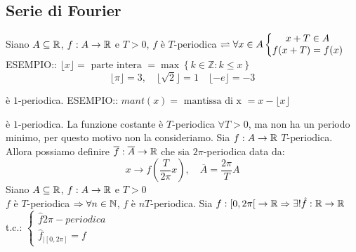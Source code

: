 \subsection{Serie di Fourier}
Siano $A\subseteq \mathbb{R}$, $f:A\to \mathbb{R}$ e $T>0$, $f$ è $T$-periodica $\rightleftharpoons \forall x\in A
\left\{\begin{matrix}
x+T\in A\\f(x+T)=f(x)
\end{matrix}\right. $\\


ESEMPIO:: $\lfloor x \rfloor = \text{ parte intera } = \max\left\{k\in\mathbb{Z}:k\le x\right\}$
\[\lfloor \pi \rfloor=3, \quad \lfloor \sqrt{2} \rfloor = 1 \quad \lfloor -e \rfloor = -3 \]
\begin{center}
\end{center}
è $1$-periodica.
ESEMPIO:: $mant(x)=\text{ mantissa di x } = x- \lfloor x \rfloor$
\begin{center}
\end{center}
è $1$-periodica.
\observation
La funzione costante è $T$-periodica $\forall T>0$, ma non ha un periodo minimo, per questo motivo non la consideriamo.
\observation
Sia $f:A\to \mathbb{R}$ $T$-periodica. Allora possiamo definire $\overline{f}:\overline{A}\to \mathbb{R}$ che sia $2\pi$-periodica data da:
\[x\to f\left(\frac{T}{2\pi}x\right),\quad \overline{A}=\frac{2\pi}{T}A\]
\proposition
Siano $A\subseteq \mathbb{R}$, $f:A\to \mathbb{R}$ e $T>0$\\
$f$ è $T$-periodica $\Rightarrow \forall n\in\mathbb{N}$, $f$ è $nT$-periodica.
\proposition
Sia $f:\left[0,2\pi\right[\to \mathbb{R} \Rightarrow \exists ! \hat{f}: \mathbb{R}\to \mathbb{R}$ t.c.: $\left\{\begin{matrix} \hat{f} 2\pi-periodica\\\hat{f}_{\left|\left[0,2\pi\right]\right.}=f\end{matrix}\right.$
